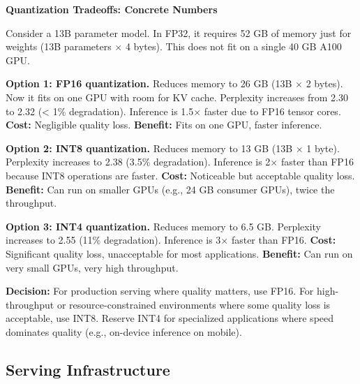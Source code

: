 \begin{examplebox}
\textbf{Quantization Tradeoffs: Concrete Numbers}

\vspace{0.5em}

Consider a 13B parameter model. In FP32, it requires 52 GB of memory just for weights (13B parameters $\times$ 4 bytes). This does not fit on a single 40 GB A100 GPU.

\vspace{0.5em}

\textbf{Option 1: FP16 quantization.} Reduces memory to 26 GB (13B $\times$ 2 bytes). Now it fits on one GPU with room for KV cache. Perplexity increases from 2.30 to 2.32 (< 1\% degradation). Inference is 1.5$\times$ faster due to FP16 tensor cores. \textbf{Cost:} Negligible quality loss. \textbf{Benefit:} Fits on one GPU, faster inference.

\vspace{0.5em}

\textbf{Option 2: INT8 quantization.} Reduces memory to 13 GB (13B $\times$ 1 byte). Perplexity increases to 2.38 (3.5\% degradation). Inference is 2$\times$ faster than FP16 because INT8 operations are faster. \textbf{Cost:} Noticeable but acceptable quality loss. \textbf{Benefit:} Can run on smaller GPUs (e.g., 24 GB consumer GPUs), twice the throughput.

\vspace{0.5em}

\textbf{Option 3: INT4 quantization.} Reduces memory to 6.5 GB. Perplexity increases to 2.55 (11\% degradation). Inference is 3$\times$ faster than FP16. \textbf{Cost:} Significant quality loss, unacceptable for most applications. \textbf{Benefit:} Can run on very small GPUs, very high throughput.

\vspace{0.5em}

\textbf{Decision:} For production serving where quality matters, use FP16. For high-throughput or resource-constrained environments where some quality loss is acceptable, use INT8. Reserve INT4 for specialized applications where speed dominates quality (e.g., on-device inference on mobile).
\end{examplebox}


\vspace{1.5em}

\subsection{Serving Infrastructure}

